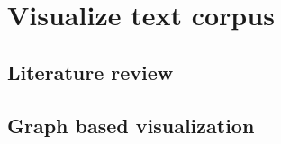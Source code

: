 \section{Visualize text corpus}

\subsection{Literature review}


\subsection{Graph based visualization} 